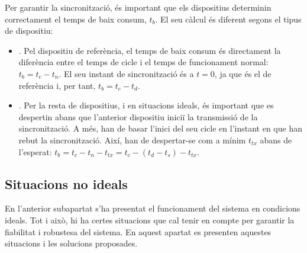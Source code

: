 \documentclass{tfgitic}[2024/07/01]
\begin{document}
{Per garantir la sincronització, és important que els dispositius determinin correctament el temps de baix consum, $t_b$. El seu càlcul és diferent segons el tipus de dispositiu:
\begin{itemize}
    \item {}. Pel dispositiu de referència, el temps de baix consum és directament la diferència entre el temps de cicle i el temps de funcionament normal: $t_b = t_c - t_n$. El seu instant de sincronització és a $t=0$, ja que és el de referència i, per tant, $t_b = t_c - t_d$.
    \item {}. Per la resta de dispositius, i en situacions ideals, és important que es despertin abans que l'anterior dispositiu iniciï la transmissió de la sincronització. A més, han de basar l'inici del seu cicle en l'instant en que han rebut la sincronització. Així, han de despertar-se com a mínim $t_{tx}$ abans de l'esperat: $t_b = t_c - t_n - t_{tx} = t_c - (t_d - t_s) - t_{tx}$.
\end{itemize}





\subsection{Situacions no ideals}
En l'anterior subapartat s'ha presentat el funcionament del sistema en condicions ideals. Tot i això, hi ha certes situacions que cal tenir en compte per garantir la fiabilitat i robustesa del sistema. En aquest apartat es presenten aquestes situacions i les solucions proposades. 

}
\end{document}
